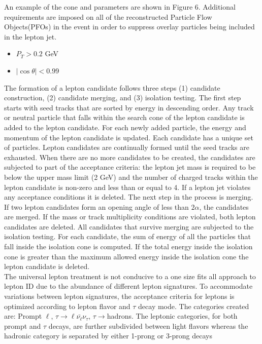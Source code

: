 An example of the cone and parameters are shown in Figure 6. Additional requirements are imposed on all of the reconstructed Particle Flow Objects(PFOs) in the event in order to suppress overlay particles being included in the lepton jet.
\begin{itemize}
\item $P_T > 0.2$ GeV
\item $|\cos\theta| < 0.99$
\end{itemize}
The formation of a lepton candidate follows three steps (1) candidate construction, (2) candidate merging, and (3) isolation testing.
The first step starts with seed tracks that are sorted by energy in descending order. Any track or neutral particle that falls within the search cone of the lepton candidate is added to the lepton candidate. For each newly added particle, the energy and momentum of the lepton candidate is updated. Each candidate has a unique set of particles. Lepton candidates are continually formed until the seed tracks are exhausted. When there are no more candidates to be created, the candidates are subjected to part of the acceptance criteria: the lepton jet mass is required to be below the upper mass limit (2 GeV) and the number of charged tracks within the lepton candidate is non-zero and less than or equal to 4. If a lepton jet violates any acceptance conditions it is deleted. The next step in the process is merging. If two lepton candidates form an opening angle of less than $2\alpha$, the candidates are merged. If the mass or track multiplicity conditions are violated, both lepton candidates are deleted.  All  candidates that survive merging are subjected to the isolation testing. For each candidate, the sum of energy of all the particles that fall inside the isolation cone is computed. If the total energy inside the isolation cone is greater than the maximum allowed energy inside the isolation cone the lepton candidate is deleted.\\

	The universal lepton treatment is not conducive to a one size fits all approach to lepton ID due to the abundance of different lepton signatures. To accommodate variations between lepton signatures, the acceptance criteria for leptons is optimized according to lepton flavor and $\tau$ decay mode. The categories created are: Prompt $\ell$, $\tau \rightarrow \ell\bar{\nu_{\ell}} \nu_{\tau}$, $\tau \rightarrow $hadrons. The leptonic categories, for both prompt and $\tau$ decays, are further subdivided between light flavors whereas the hadronic category is separated by either 1-prong or 3-prong decays\\

